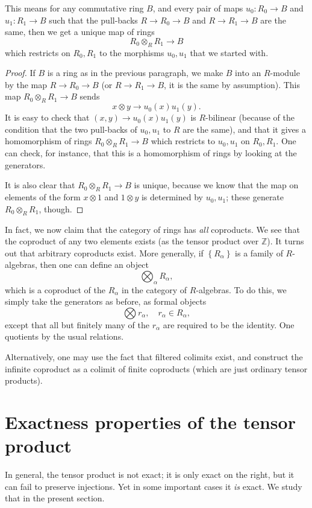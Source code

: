 This means for any commutative ring $B$, and every pair of maps $u_0: R_0 \to
B$ and $u_1: R_1 \to B$ such that the pull-backs $R \to R_0 \to B$ and $R \to
R_1 \to B$ are the same, then we get a unique map of rings
\[ R_0 \otimes_R R_1 \to B  \]
which restricts on $R_0, R_1$ to the morphisms $u_0, u_1$ that we started with.
\begin{proof} If $B$ is a ring as in the previous paragraph, we make $B$ into an $R$-module by the map $R \to R_0 \to B$ (or
$R \to R_1 \to B$, it is the same by assumption).
This map $R_0 \otimes_R R_1 \to B$ sends
\[ x \otimes y \to u_0(x) u_1(y).  \]
It is easy to check that $(x,y) \to u_0(x)u_1(y)$ is $R$-bilinear (because of
the condition that the two pull-backs of $u_0, u_1$ to $R$ are the same), and
that it gives a homomorphism of rings $R_0 \otimes_R R_1 \to B$ which
restricts to $u_0, u_1$ on $R_0,
R_1$. One can check, for instance, that this is a homomorphism of rings by
looking at the generators.

It is also clear that $R_0 \otimes_R R_1 \to B$ is unique, because we know
that the
map on elements of the form $x \otimes 1$ and $1 \otimes y$ is determined by
$u_0, u_1$; these generate $R_0 \otimes_R R_1$, though.
\end{proof}

In fact, we now claim that the category of rings has \emph{all} coproducts. We
see that the coproduct of any two elements exists (as the tensor product over
$\mathbb{Z}$). It turns out that arbitrary coproducts exist. More generally,
if $\left\{R_\alpha\right\}$ is a family of $R$-algebras, then one can define
an object
\[ \bigotimes_\alpha R_\alpha,  \]
which is a coproduct of the $R_\alpha$ in the category of $R$-algebras. To do
this, we simply take the generators as before, as formal objects
\[ \bigotimes r_\alpha, \quad r_\alpha \in R_\alpha,  \]
except that all but finitely many of  the $r_\alpha$ are required to be the
identity. One quotients by the usual relations.

Alternatively, one may use the fact that filtered colimits exist, and
construct the infinite coproduct as a colimit of finite coproducts (which are
just ordinary tensor products).

\section{Exactness properties of the tensor product}

In general, the tensor product is not exact; it is only exact on the right,
but it can fail to preserve injections. Yet in some important cases it
\emph{is}
exact. We study that in the present section.

